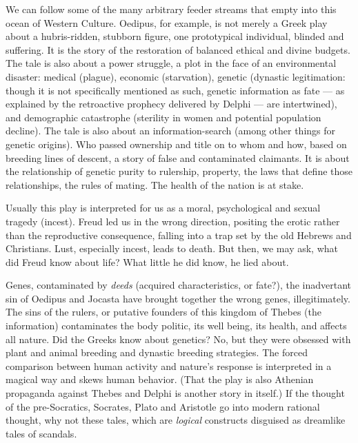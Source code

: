 We can follow some of the many arbitrary feeder streams that empty into this ocean of Western Culture. Oedipus, for example, is not merely a Greek play about a hubris-ridden, stubborn figure, one prototypical individual, blinded and suffering. It is the story of the restoration of balanced ethical and divine budgets. The tale is also about a power struggle, a plot in the face of an environmental disaster: medical (plague), economic (starvation), genetic (dynastic legitimation: though it is not specifically mentioned as such, genetic information as fate --- as explained by the retroactive prophecy delivered by Delphi --- are intertwined), and demographic catastrophe (sterility in women and potential population decline). The tale is also about an information-search (among other things for genetic origins). Who passed ownership and title on to whom and how, based on breeding lines of descent, a story of false and contaminated claimants. It is about the relationship of genetic purity to rulership, property, the laws that define those relationships, the rules of mating. The health of the nation is at stake.

Usually this play is interpreted for us as a moral, psychological and sexual tragedy (incest). Freud led us in the wrong direction, positing the erotic rather than the reproductive consequence, falling into a trap set by the old Hebrews and Christians. Lust, especially incest, leads to death. But then, we may ask, what did Freud know about life? What little he did know, he lied about.

Genes, contaminated by \emph{deeds} (acquired characteristics, or fate?), the inadvertant sin of Oedipus and Jocasta have brought together the wrong genes, illegitimately. The sins of the rulers, or putative founders of this kingdom of Thebes (the information) contaminates the body politic, its well being, its health, and affects all nature. Did the Greeks know about genetics? No, but they were obsessed with plant and animal breeding and dynastic breeding strategies. The forced comparison between human activity and nature's response is interpreted in a magical way and skews human behavior. (That the play is also Athenian propaganda against Thebes and Delphi is another story in itself.) If the thought of the pre-Socratics, Socrates, Plato and Aristotle go into modern rational thought, why not these tales, which are \emph{logical} constructs disguised as dreamlike tales of scandals.

